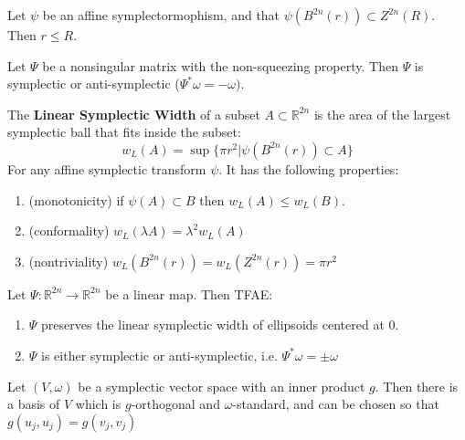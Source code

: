\begin{thm}

Let $\psi$ be an affine symplectormophism, and that $\psi(B^{2n}(r)) \subset Z^{2n}(R)$. Then $r \leq R$.

\end{thm}

\begin{thm}

Let $\Psi$ be a nonsingular matrix with the non-squeezing property. Then $\Psi$ is symplectic or anti-symplectic ($\Psi^*\omega = -\omega)$. 

\end{thm}

\begin{defn}

The \textbf{Linear Symplectic Width} of a subset $A \subset \mathbb{R}^{2n}$ is the area of the largest symplectic ball that fits inside the subset: 
\[
w_L(A) = \sup \{\pi r^2 \vert \psi(B^{2n}(r)) \subset A\}
\]
For any affine symplectic transform $\psi$. It has the following properties:

\begin{enumerate}
    \item (monotonicity) if $\psi(A) \subset B$ then $w_L(A) \leq w_L(B)$.
    \item (conformality) $w_L(\lambda A) = \lambda^2 w_L(A)$
    \item (nontriviality) $w_L(B^{2n}(r)) = w_L(Z^{2n}(r)) = \pi r^2$
\end{enumerate}
\end{defn}

\begin{thm}

Let $\Psi: \mathbb{R}^{2n} \to \mathbb{R}^{2n}$ be a linear map. Then TFAE:

\begin{enumerate}
    \item $\Psi$ preserves the linear symplectic width of ellipsoids centered at $0$.
    \item $\Psi$ is either symplectic or anti-symplectic, i.e. $\Psi^* \omega = \pm \omega$
\end{enumerate}

\end{thm}

\begin{lem}

Let $(V,\omega)$ be a symplectic vector space with an inner product $g$. Then there is a basis of $V$ which is $g$-orthogonal and $\omega$-standard, and can be chosen so that $g(u_j, u_j) = g(v_j, v_j)$

\end{lem}


